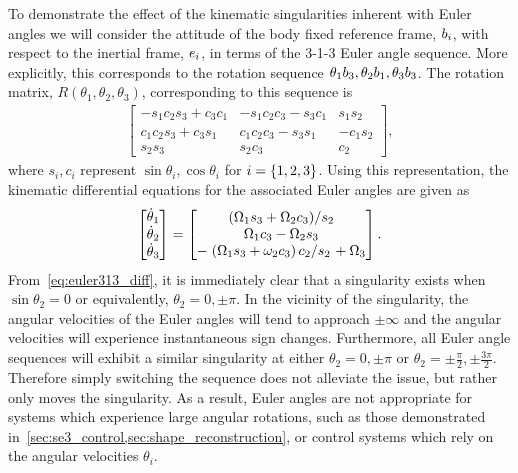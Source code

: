 To demonstrate the effect of the kinematic singularities inherent with Euler angles we will consider the attitude of the body fixed reference frame, \( b_i \), with respect to the inertial frame, \( e_i\), in terms of the 3-1-3 Euler angle sequence.
More explicitly, this corresponds to the rotation sequence \( \theta_1 b_3 , \theta_2 b_1, \theta_3 b_3 \).
The rotation matrix, \( R(\theta_1, \theta_2, \theta_3) \), corresponding to this sequence is 
\begin{align}\label{eq:euler313}
    \begin{bmatrix}
        -s_1 c_2 s_3 + c_3 c_1 & -s_1 c_2 c_3 - s_3 c_1 & s_1s_2 \\
        c_1 c_2 s_3 + c_3 s_1 & c_1 c_2 c_3 - s_3 s_1 & - c_1 s_2 \\
        s_2 s_3 & s_2 c_3 & c_2
    \end{bmatrix} ,
\end{align}
where \( s_i, c_i \) represent \( \sin \theta_i, \cos \theta_i \) for \( i = \left\{ 1,2,3 \right\}\).
Using this representation, the kinematic differential equations for the associated Euler angles are given as
\begin{align}\label{eq:euler313_diff}
    \begin{bmatrix}
        \dot{\theta}_1 \\ \dot{\theta}_2 \\ \dot{\theta}_3 
    \end{bmatrix}
    =
    \begin{bmatrix}
        \left.\left( \Omega_1 s_3 + \Omega_2 c_3 \right)\middle/s_2\right. \\
        \Omega_1 c_3 - \Omega_2 s_3 \\
        -\left.\left( \Omega_1 s_3 + \omega_2 c_3 \right)c_2\middle/s_2\right. + \Omega_3
    \end{bmatrix} .
\end{align}
From~\cref{eq:euler313_diff}, it is immediately clear that a singularity exists when \( \sin \theta_2 = 0 \) or equivalently, \( \theta_2 = 0, \pm \pi \). 
In the vicinity of the singularity, the angular velocities of the Euler angles will tend to approach \( \pm \infty \) and the angular velocities will experience instantaneous sign changes.
Furthermore, all Euler angle sequences will exhibit a similar singularity at either \( \theta_2 = 0, \pm \pi \) or \( \theta_2 = \pm \frac{\pi}{2}, \pm \frac{3\pi}{2} \).
Therefore simply switching the sequence does not alleviate the issue, but rather only moves the singularity.
As a result, Euler angles are not appropriate for systems which experience large angular rotations, such as those demonstrated in~\cref{sec:se3_control,sec:shape_reconstruction}, or control systems which rely on the angular velocities \( \theta_i \).


